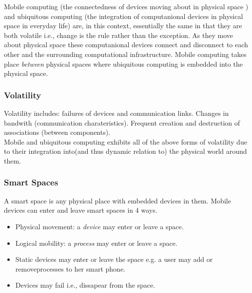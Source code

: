 Mobile computing (the connectedness of devices moving about in physical space ) and ubiquitous computing (the integration of computanional devices in physical space in everyday life) are, in this context, essentially the same in that they are both volatile i.e., change is the rule rather than the exception. As they move about physical space these computanional devices connect and disconnect to each other and the surrounding computational infrastructure. Mobile computing takes place \textit{between} physical spaces where ubiquitous computing is embedded into the physical space. \\

\begin{comment}
Because of this, mobile computing is considered 'volatile'.  \\ 
\end{comment}

\subsubsection{Volatility}
\label{volatility}
Volatility includes: failures of devices and communication links. Changes in bandwith (communication charateristics). Frequent creation and destruction of associations (between components). \\
 
Mobile and ubiquitous computing exhibits all of the above forms of volatility due to their integration into(and thus dynamic relation to) the physical world around them.\\


\subsubsection{Smart Spaces}
A smart space is any physical place with embedded devices in them. Mobile devices can enter and leave smart spaces in 4 ways.

\begin{itemize}
\item Physical movement: a \textit{device} may enter or leave a space. 
\item Logical mobility: a \textit{process} may enter or leave a space. 
\item Static devices may enter or leave the space e.g. a user may add or removeprocesses to her smart phone. 
\item Devices may fail i.e., dissapear from the space. 
\end{itemize}




